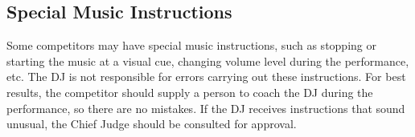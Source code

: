 \subsection{Special Music Instructions}
Some competitors may have special music instructions, such as stopping or starting the music at a visual cue, changing volume level during the performance, etc.
The DJ is not responsible for errors carrying out these instructions.
For best results, the competitor should supply a person to coach the DJ during the performance, so there are no mistakes.
If the DJ receives instructions that sound unusual, the Chief Judge should be consulted for approval.


